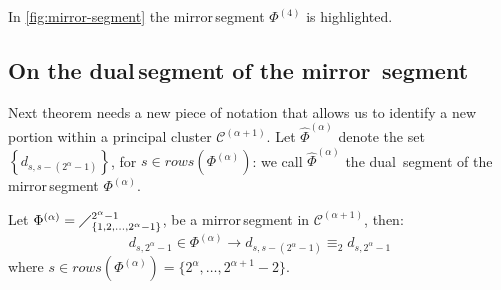 
In \autoref{fig:mirror-segment} the \flqq mirror\frqq\,segment $\Phi^{(4)}$ is highlighted.

\subsection{On the \flqq dual\frqq\,segment of the \flqq mirror\frqq\, segment}

Next theorem needs a new piece of notation that allows us to identify a 
new portion within a principal cluster $\mathcal{C}^{(\alpha+1)}$.
Let $\hat{\Phi}^{(\alpha)}$ denote the set $\left\lbrace d_{s,s-(2^{\alpha}-1)}\right\rbrace$,
for $s\in rows\left(\Phi^{(\alpha)}\right)$: we call $\hat{\Phi}^{(\alpha)}$  
the \flqq dual\frqq\, segment of the \flqq mirror\frqq\,segment $\Phi^{(\alpha)}$.

\begin{theorem}
    Let  $\Phi^{(\alpha)}=\diagup_{\lbrace 1,2,\ldots,2^{\alpha}-1\rbrace}^{2^{\alpha}-1}$, 
    be a \flqq mirror\frqq\,segment in $\mathcal{C}^{(\alpha+1)}$, then: 
    \begin{equation}
        d_{s,2^{\alpha}-1}\in\Phi^{(\alpha)}\rightarrow d_{s,s-(2^{\alpha}-1)}\equiv_{2}d_{s,2^{\alpha}-1}
    \end{equation}
    where $s\in rows\left(\Phi^{(\alpha)}\right)=\lbrace2^{\alpha},\ldots,2^{\alpha+1}-2\rbrace$.
\end{theorem}


